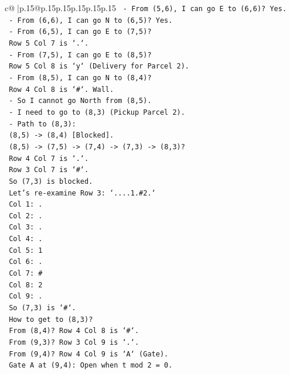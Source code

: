 \documentclass{article}
\begin{document}
{\begin{supertabular}{c@{$\;$}|p{.15\linewidth}@{}p{.15\linewidth}p{.15\linewidth}p{.15\linewidth}p{.15\linewidth}p{.15\linewidth}}
{{{\texttt{  {-} From (5,6), I can go E to (6,6)? Yes.} \\
\texttt{  {-} From (6,6), I can go N to (6,5)? Yes.} \\
\texttt{  {-} From (6,5), I can go E to (7,5)?} \\
\texttt{    Row 5 Col 7 is `.`.} \\
\texttt{  {-} From (7,5), I can go E to (8,5)?} \\
\texttt{    Row 5 Col 8 is `y` (Delivery for Parcel 2).} \\
\texttt{  {-} From (8,5), I can go N to (8,4)?} \\
\texttt{    Row 4 Col 8 is `\#`. Wall.} \\
\texttt{  {-} So I cannot go North from (8,5).} \\
\texttt{  {-} I need to go to (8,3) (Pickup Parcel 2).} \\
\texttt{  {-} Path to (8,3):} \\
\texttt{    (8,5) {-}> (8,4) {[}Blocked{]}.} \\
\texttt{    (8,5) {-}> (7,5) {-}> (7,4) {-}> (7,3) {-}> (8,3)?} \\
\texttt{    Row 4 Col 7 is `.`.} \\
\texttt{    Row 3 Col 7 is `\#`.} \\
\texttt{    So (7,3) is blocked.} \\
\texttt{    Let's re{-}examine Row 3: `....1.\#2.`} \\
\texttt{    Col 1: .} \\
\texttt{    Col 2: .} \\
\texttt{    Col 3: .} \\
\texttt{    Col 4: .} \\
\texttt{    Col 5: 1} \\
\texttt{    Col 6: .} \\
\texttt{    Col 7: \#} \\
\texttt{    Col 8: 2} \\
\texttt{    Col 9: .} \\
\texttt{    So (7,3) is `\#`.} \\
\texttt{    How to get to (8,3)?} \\
\texttt{    From (8,4)? Row 4 Col 8 is `\#`.} \\
\texttt{    From (9,3)? Row 3 Col 9 is `.`.} \\
\texttt{    From (9,4)? Row 4 Col 9 is `A` (Gate).} \\
\texttt{    Gate A at (9,4): Open when t mod 2 = 0.} \\
}}}
\end{supertabular}}
\end{document}
